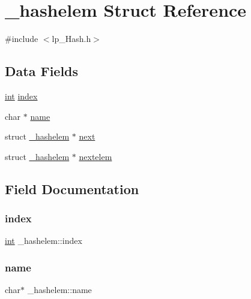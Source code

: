 \hypertarget{struct__hashelem}{}\section{\+\_\+hashelem Struct Reference}
\label{struct__hashelem}


{\ttfamily \#include $<$lp\+\_\+\+Hash.\+h$>$}

\subsection*{Data Fields}
\begin{DoxyCompactItemize}
\item 
\hyperlink{lp__lib_8h_adeb9ec6400320e4923ac9d836d509ddb}{int} \hyperlink{struct__hashelem_aa64dc83dd0730824eeebad098c40e426}{index}
\item 
char $\ast$ \hyperlink{struct__hashelem_ae76ab3facab0deb2dd25a4ec2d21f95a}{name}
\item 
struct \hyperlink{struct__hashelem}{\+\_\+hashelem} $\ast$ \hyperlink{struct__hashelem_a925499a1ad0bba3d46261e225db91f54}{next}
\item 
struct \hyperlink{struct__hashelem}{\+\_\+hashelem} $\ast$ \hyperlink{struct__hashelem_aa595ef35a10ccc03e3f63259b0018903}{nextelem}
\end{DoxyCompactItemize}


\subsection{Field Documentation}
\mbox{\label{struct__hashelem_aa64dc83dd0730824eeebad098c40e426}} 
\subsubsection{\texorpdfstring{index}{index}}
{\footnotesize\ttfamily \hyperlink{lp__lib_8h_adeb9ec6400320e4923ac9d836d509ddb}{int} \+\_\+hashelem\+::index}

\mbox{\label{struct__hashelem_ae76ab3facab0deb2dd25a4ec2d21f95a}} 
\subsubsection{\texorpdfstring{name}{name}}
{\footnotesize\ttfamily char$\ast$ \+\_\+hashelem\+::name}

